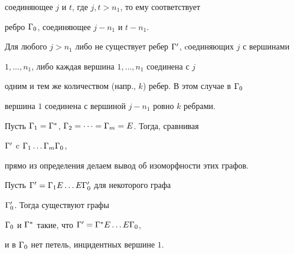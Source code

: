 \begin{pf}
соединяющее $j$ и $t$, где $j, t>n_1$, то ему соответствует 


ребро ${\Gamma}_0$, соединяющее $j-n_1$ и $t-n_1$.  


Для любого $j>n_1$ либо не существует ребер ${\Gamma}'$, cоединяющих $j$ с вершинами 


$1, \dotsc , n_1$, либо каждая вершина $1, \dotsc , n_1$ соединена с $j$ 


одним и тем же количеством (напр., $k$) ребер. В этом случае в ${\Gamma}_0$ 


вершина $1$ соединена с вершиной $j-n_1$ ровно $k$ ребрами.


Пусть ${\Gamma}_1={\Gamma}^*$, ${\Gamma}_2=\dotsb ={\Gamma}_m=E$. Тогда, сравнивая 


${\Gamma}'$ c ${\Gamma}_1\dotsc {\Gamma}_m{\Gamma}_0$,


прямо из определения делаем вывод об изоморфности этих графов.


\end{pf}








\begin{lem}


Пусть ${\Gamma}'={\Gamma}_1E\dotsc E{\Gamma}'_0$ для некоторого графа 


${\Gamma}'_0$. Тогда существуют графы 


${\Gamma}_0$ и ${\Gamma}^*$ такие, что ${\Gamma}'={\Gamma}^*E\dotsc E{\Gamma}_0$, 


и в ${\Gamma}_0$ нет петель, инцидентных вершине $1$. 


\end{lem}





